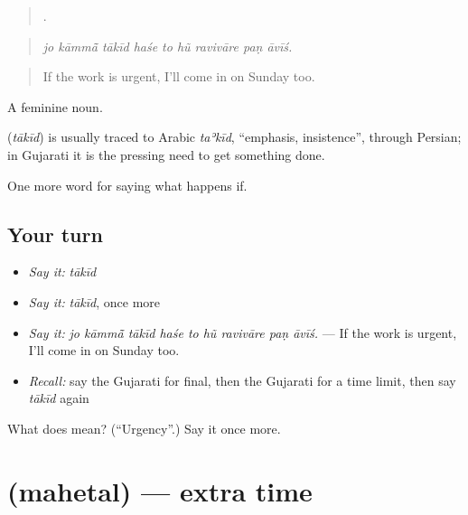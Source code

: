 \begin{quote}
        .
\end{quote}

\begin{quote}
\emph{jo kāmmā̃ tākīd haśe to hũ ravivāre paṇ āvīś.}
\end{quote}

\begin{quote}
If the work is urgent, I'll come in on Sunday too.
\end{quote}

A feminine noun.

\begin{cousinweb}
\textbf{} (\emph{tākīd}) is usually traced to Arabic \emph{taʾkīd}, \textquotedblleft{}emphasis, insistence\textquotedblright{}, through Persian; in Gujarati it is the pressing need to get something done.
\end{cousinweb}

\begin{grammarlens}[title={What you've built}]
One more word for saying what happens if.
\end{grammarlens}

\subsection*{Your turn}
\begin{itemize}
\raggedright
  \item \emph{Say it:} \emph{tākīd}
  \item \emph{Say it:} \emph{tākīd}, once more
  \item \emph{Say it:} \emph{jo kāmmā̃ tākīd haśe to hũ ravivāre paṇ āvīś.} — If the work is urgent, I'll come in on Sunday too.
  \item \emph{Recall:} say the Gujarati for final, then the Gujarati for a time limit, then say \emph{tākīd} again
\end{itemize}

\begin{tcolorbox}[breakable,colback=teal!4,colframe=teal!35!black,title={Before you move on}]
What does  mean? (\textquotedblleft{}Urgency\textquotedblright{}.) Say it once more.
\end{tcolorbox}
\section[\texorpdfstring{\gu{મહેતલ} (mahetal)}{મહેતલ (mahetal)}]{ (mahetal) — extra time}

